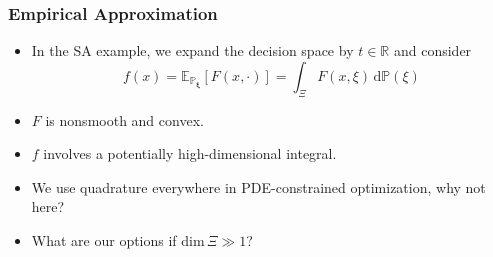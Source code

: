 \documentclass[aspectratio=169,xcolor=dvipsnames,10pt]{beamer}
\newcommand{\bbp}{\mathbb{P}}
\begin{document}
\begin{frame}\frametitle{Empirical Approximation}

\begin{exampleblock}{}
\begin{itemize}
\item
In the SA example, we expand the decision space by $t \in \mathbb R$ and consider
\[
 f(x) = \mathbb E_{\mathbb P_{\bm \xi}}[F(x,\cdot)] = \int_{\Xi} F(x,\xi) \, \mathrm{d} \mathbb P(\xi)
 \]
 \item  $F$ is \alert{nonsmooth} and convex. 
 \item $f$ involves a potentially high-dimensional integral. 
 \item We use quadrature everywhere in PDE-constrained optimization, why not here? 
 \item What are our options if $\mathrm{dim}\, \Xi \gg 1$?
 \end{itemize}
\end{exampleblock}
\end{frame}
\end{document}
